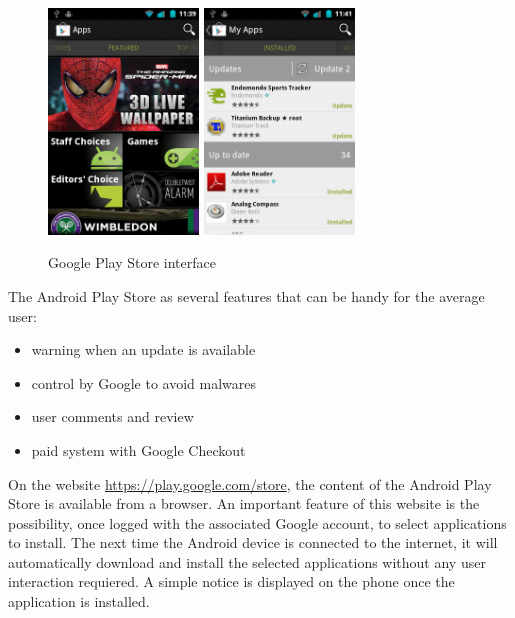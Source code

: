 \begin{figure}[h]
  \centering
  \includegraphics[width=4cm]{images/market1.png}
  \includegraphics[width=4cm]{images/market2.png}
  \caption{Google Play Store interface}
  \label{fig:market}
\end{figure}

The Android Play Store as several features that can be handy for the average user:
\begin{itemize}
\item warning when an update is available
\item control by Google to avoid malwares
\item user comments and review
\item paid system with Google Checkout
\end{itemize}

On the website \url{https://play.google.com/store}, the content of the Android Play Store is available from a browser.
An important feature of this website is the possibility, once logged with the associated Google account, to select applications to install.
The next time the Android device is connected to the internet, it will automatically download and install the selected applications without any user interaction requiered.
A simple notice is displayed on the phone once the application is installed.\\

